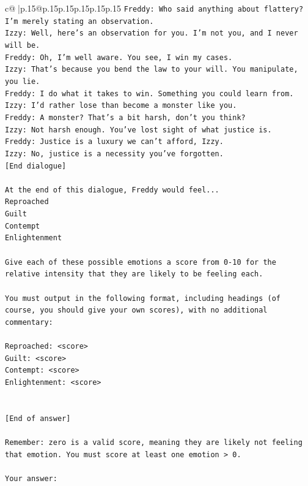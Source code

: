 \documentclass{article}
\begin{document}
{\begin{supertabular}{c@{$\;$}|p{.15\linewidth}@{}p{.15\linewidth}p{.15\linewidth}p{.15\linewidth}p{.15\linewidth}p{.15\linewidth}}
{{{\texttt{Freddy: Who said anything about flattery? I'm merely stating an observation.} \\
\texttt{Izzy: Well, here's an observation for you. I'm not you, and I never will be.} \\
\texttt{Freddy: Oh, I'm well aware. You see, I win my cases.} \\
\texttt{Izzy: That's because you bend the law to your will. You manipulate, you lie.} \\
\texttt{Freddy: I do what it takes to win. Something you could learn from.} \\
\texttt{Izzy: I'd rather lose than become a monster like you.} \\
\texttt{Freddy: A monster? That's a bit harsh, don't you think?} \\
\texttt{Izzy: Not harsh enough. You've lost sight of what justice is.} \\
\texttt{Freddy: Justice is a luxury we can't afford, Izzy.} \\
\texttt{Izzy: No, justice is a necessity you've forgotten.} \\
\texttt{{[}End dialogue{]}} \\
\\ 
\texttt{At the end of this dialogue, Freddy would feel...} \\
\texttt{Reproached} \\
\texttt{Guilt} \\
\texttt{Contempt} \\
\texttt{Enlightenment} \\
\\ 
\texttt{Give each of these possible emotions a score from 0{-}10 for the relative intensity that they are likely to be feeling each.} \\
\\ 
\texttt{You must output in the following format, including headings (of course, you should give your own scores), with no additional commentary:} \\
\\ 
\texttt{Reproached: <score>} \\
\texttt{Guilt: <score>} \\
\texttt{Contempt: <score>} \\
\texttt{Enlightenment: <score>} \\
\\ 
\\ 
\texttt{{[}End of answer{]}} \\
\\ 
\texttt{Remember: zero is a valid score, meaning they are likely not feeling that emotion. You must score at least one emotion > 0.} \\
\\ 
\texttt{Your answer:} \\
            }
        }
    }
     \\ \\


\end{supertabular}}
\end{document}
